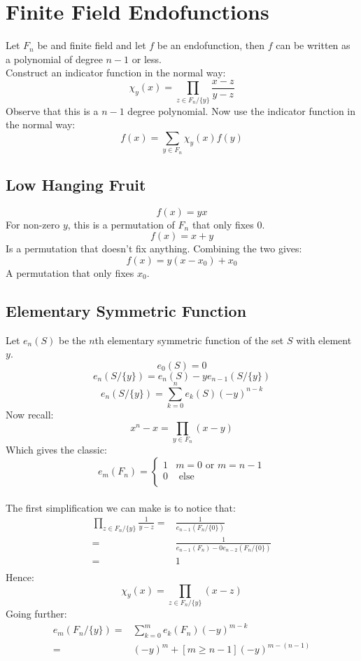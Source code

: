 
\section{Finite Field Endofunctions}
Let $F_n$ be and finite field and let $f$ be an endofunction,
then $f$ can be written as a polynomial of degree $n-1$ or less.
\\

Construct an indicator function in the normal way:
\[\chi_y(x) = \prod_{z\in F_n/\{y\}}\frac{x-z}{y-z}\]
Observe that this is a $n-1$ degree polynomial.
Now use the indicator function in the normal way:
\[f(x) = \sum_{y\in F_n}\chi_y(x)f(y)\]

\subsection{Low Hanging Fruit}
\[f(x) = yx\]
For non-zero $y$,
this is a permutation of $F_n$ that only fixes $0$.
\[f(x) = x+y\]
Is a permutation that doesn't fix anything.
Combining the two gives:
\[f(x) = y(x-x_0)+x_0\]
A permutation that only fixes $x_0$.

\subsection{Elementary Symmetric Function}
Let $e_n(S)$ be the $n$th elementary symmetric function of the set $S$ with element $y$.
\[e_0(S) = 0\]
\[e_n(S/\{y\})=e_n(S)-ye_{n-1}(S/\{y\})\]
\[e_n(S/\{y\})=\sum_{k=0}^ne_k(S)(-y)^{n-k}\]
Now recall:
\[x^{n}-x = \prod_{y\in F_n}(x-y)\]
Which gives the classic:
\[e_m(F_n) = \begin{cases} 1 & m = 0\text{ or } m = n-1\\ 0 & \text{ else}\\\end{cases}\]
\\

The first simplification we can make is to notice that:
\begin{equation*}
\begin{aligned}
\prod_{z\in F_n/\{y\}}\frac{1}{y-z} =& \frac{1}{e_{n-1}(F_n/\{0\})}\\
=& \frac{1}{e_{n-1}(F_n)-0e_{n-2}(F_n/\{0\})}\\
=&1\\
\end{aligned}
\end{equation*}
Hence:
\[\chi_y(x) = \prod_{z\in F_n/\{y\}}(x-z)\]
Going further:
\begin{equation*}
\begin{aligned}
e_m(F_n/\{y\})=&\sum_{k=0}^me_k(F_n)(-y)^{m-k}\\
=&(-y)^m+[m\geq n-1](-y)^{m-(n-1)}\\
\end{aligned}
\end{equation*}

